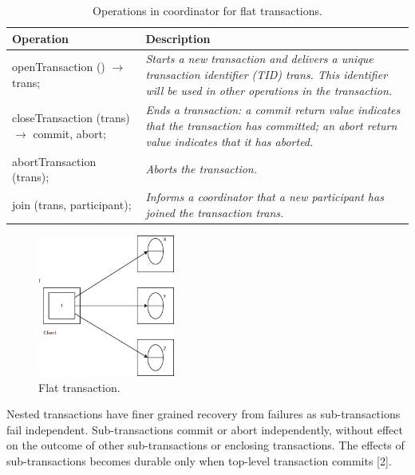 \begin{table}
	\caption{Operations in coordinator for flat transactions.}
	\label{tab:api:flattransactions}
	\begin{tabular}{p{150px} | p{250px}}
		\textbf{Operation} & \textbf{Description} \\
		\hline
		openTransaction () $\rightarrow$ trans; 		& \emph{Starts a new transaction and delivers a unique transaction identifier (TID) trans. This identifier will be used in other operations in the transaction.} \\
		closeTransaction (trans) $\rightarrow$ commit, abort; & \emph{Ends a transaction: a commit return value indicates that the transaction has committed; an abort return value indicates that it has aborted.} \\
		abortTransaction (trans); & \emph{Aborts the transaction.} \\
		join (trans, participant); & \emph{Informs a coordinator that a new participant has joined the transaction trans.} \\
		\hline
	\end{tabular}
\end{table}



\begin{figure}
	\begin{center}
		\includegraphics[width=0.4\textwidth]{img/flattransaction}
	\end{center}
	\caption{Flat transaction.}
	\label{fig:flattransaction}
\end{figure}



Nested transactions have finer grained recovery from failures as sub-transactions fail independent. Sub-transactions commit or abort independently, without effect on the outcome of other sub-transactions or enclosing transactions. The effects of sub-transactions becomes durable only when top-level transaction commits [2].

